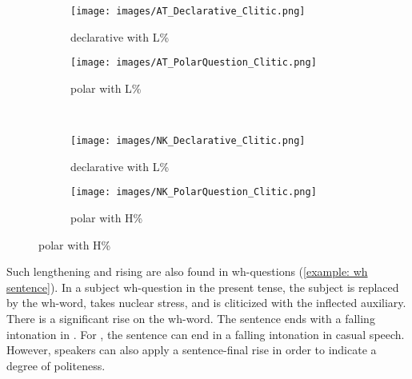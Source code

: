 		\begin{figure}
			\caption{Pitch track of declarative (\ref{example: v-aux dec sentence}) and polar question (\ref{example: v-aux polar sentence})   in {\seaAbbre}   and  {\iaAbbre} }
			\label{fig:smoke pitch}
			\begin{subfigure}[b]{0.5\textwidth}
				\texttt{[image: images/AT\_Declarative\_Clitic.png]}
				\caption{{\seaAbbre} declarative   with L\%}
			\end{subfigure}%
			\begin{subfigure}[b]{0.5\textwidth}
				\texttt{[image: images/AT\_PolarQuestion\_Clitic.png]}
				\caption{{\seaAbbre} polar  with L\%}
			\end{subfigure}\smallskip\\
			\begin{subfigure}[b]{0.5\textwidth}
				\texttt{[image: images/NK\_Declarative\_Clitic.png]}
				\caption{{\iaAbbre} declarative   with L\%}
			\end{subfigure}%
			\begin{subfigure}[b]{0.5\textwidth}
				\texttt{[image: images/NK\_PolarQuestion\_Clitic.png]}
				\caption{{\iaAbbre} polar  with H\%}
			\end{subfigure}
		\end{figure}
		
		
		
		Such lengthening and rising are also found in wh-questions (\ref{example: wh sentence}). In a subject wh-question in the present tense, the subject is replaced by the wh-word, takes nuclear stress, and is cliticized with the inflected auxiliary. There is a significant rise on the wh-word. The sentence ends with a falling intonation in  {\seaSE} \citep[15]{Johnson-1954-EastArmGrammar}. For {\iaIA}, the sentence can end  in a falling intonation in casual speech.   However, speakers can also  apply a sentence-final rise in order to indicate a degree of politeness.
		

